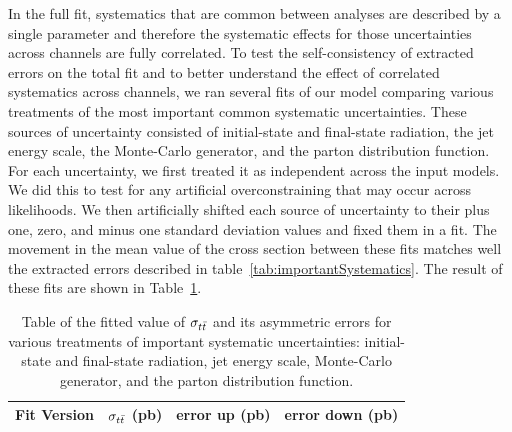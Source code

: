 In the full fit, systematics that are common between analyses are described by a single parameter and therefore the systematic effects for those uncertainties across channels are fully correlated.
To test the self-consistency of extracted errors on the total fit and to better understand the effect of correlated systematics across channels, 
we ran several fits of our model comparing various treatments of the most important common systematic uncertainties.
These sources of uncertainty consisted of initial-state and final-state radiation, the jet energy scale, the Monte-Carlo generator, and the parton distribution function.
For each uncertainty, we first treated it as independent across the input models.  
We did this to test for any artificial overconstraining that may occur across likelihoods.
We then artificially shifted each source of uncertainty to their plus one, zero, and minus one standard deviation values and fixed them in a fit. 
The movement in the mean value of the cross section between these fits matches well the extracted errors described in table~\ref{tab:importantSystematics}.
The result of these fits are shown in Table~\ref{tab:SystematicDecorrelation}. 

\begin{table}[htbp]

  \begin{center}  
    \begin{tabular}{|c|ccc|}
      \hline
      Fit Version & $\sigma_{t\bar{t}}$ (pb) & error up (pb) & error down (pb)  \\
      \hline
      \hline
      
      \hline
    \end{tabular}
  \end{center}
  \caption{ \label{tab:SystematicDecorrelation} Table of the fitted value of $\sigma_{ t\bar{t} }$ and its asymmetric errors for various treatments of important systematic uncertainties: initial-state and final-state radiation, jet energy scale, Monte-Carlo generator, and the parton distribution function.   }
\end{table}






